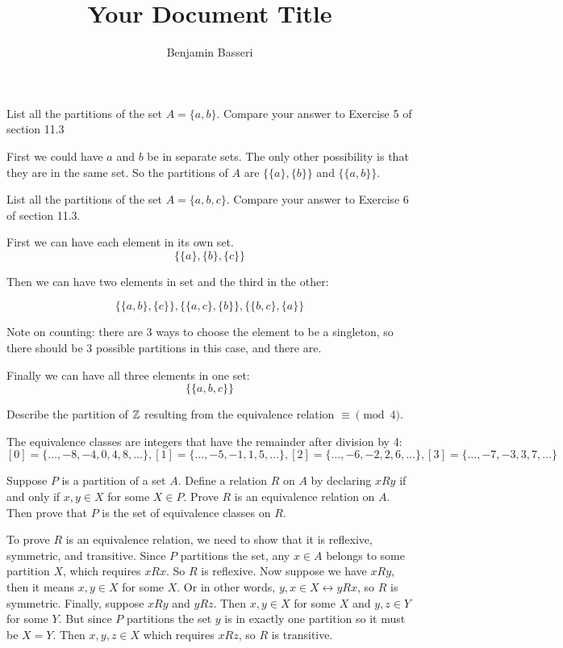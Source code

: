 \documentclass{article}
\title{Your Document Title}
\author{Benjamin Basseri}
\begin{document}
\maketitle

\begin{problem}
List all the partitions of the set $A = \{a, b\}$. Compare your answer to Exercise 5 of section 11.3
\end{problem}

First we could have $a$ and $b$ be in separate sets. The only other possibility is that they are in the same set. So the partitions of $A$ are $\{\{a\}, \{b\}\}$ and $\{\{a, b\}\}$.

\begin{problem}
List all the partitions of the set $A = \{a, b, c\}$. Compare your answer to Exercise 6 of section 11.3.
\end{problem}

First we can have each element in its own set.
$$\{\{a\}, \{b\}, \{c\}\}$$

Then we can have two elements in set and the third in the other:

$$\{\{a, b\}, \{c\}\}, \{\{a, c\}, \{b\}\}, \{\{b, c\}, \{a\}\}$$

Note on counting: there are 3 ways to choose the element to be a singleton, so there should be 3 possible partitions in this case, and there are.

Finally we can have all three elements in one set:
$$\{\{a, b, c\}\}$$

\begin{problem}
Describe the partition of $\mathbb{Z}$ resulting from the equivalence relation $\equiv \pmod{4}$.
\end{problem}

The equivalence classes are integers that have the remainder after division by 4:
$$[0] = \{\ldots, -8, -4, 0, 4, 8, \ldots\}, [1] = \{\ldots, -5, -1, 1, 5, \ldots\}, [2] = \{\ldots, -6, -2, 2, 6, \ldots\}, [3] = \{\ldots, -7, -3, 3, 7, \ldots\}$$

\begin{problem}
Suppose $P$ is a partition of a set $A$. Define a relation $R$ on $A$ by declaring $xRy$ if and only if $x, y \in X$ for some $X \in P$. Prove $R$ is an equivalence relation on $A$. Then prove that $P$ is the set of equivalence classes on $R$.
\end{problem}

To prove $R$ is an equivalence relation, we need to show that it is reflexive, symmetric, and transitive. Since $P$ partitions the set, any $x \in A$ belongs to some partition $X$, which requires $xRx$. So $R$ is reflexive. Now suppose we have $xRy$, then it means $x, y \in X$ for some $X$. Or in other words, $y, x \in X \leftrightarrow yRx$, so $R$ is symmetric. Finally, suppose $xRy$ and $yRz$. Then $x, y \in X$ for some $X$ and $y, z \in Y$ for some $Y$. But since $P$ partitions the set $y$ is in exactly one partition so it must be $X = Y$. Then $x, y, z \in X$ which requires $xRz$, so $R$ is transitive.
\end{document}
